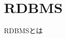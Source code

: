 \documentclass[../../../main]{subfiles}
\begin{document}
    \section{RDBMS}\label{sec:phraseology-rdbms}

    RDBMSとは
\end{document}
